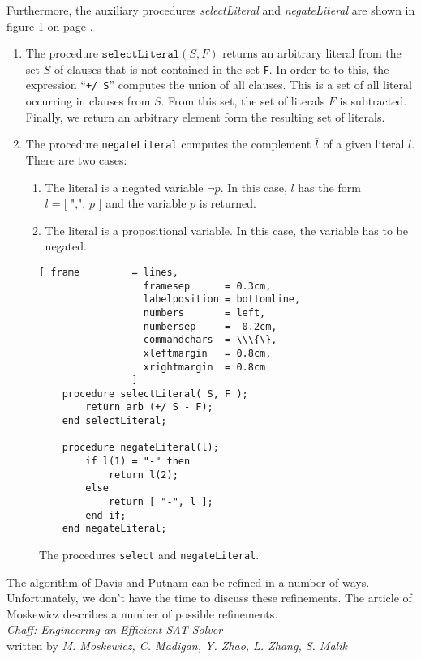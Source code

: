 \noindent
Furthermore, the auxiliary procedures \textsl{selectLiteral} and \textsl{negateLiteral}
are shown in figure  \ref{fig:solve-aux} on page \pageref{fig:solve-aux}.
\begin{enumerate}
\item The procedure $\texttt{selectLiteral}(S, F)$ returns an arbitrary literal from the
      set $S$ of clauses that is not contained in the set \texttt{F}.  In order to to
      this, the expression ``\texttt{+/ S}'' computes the union of all clauses.  This is a
      set of all literal occurring in clauses from $S$.  From this set, the set of
      literals $F$ is subtracted.  Finally, we return an arbitrary element form the
      resulting set of literals.
\item The procedure \texttt{negateLiteral} computes the complement $\overline{l}$ 
      of a given literal  $l$.  There are two cases:  
      \begin{enumerate}
      \item The literal is a negated variable $\neg p$.  In this case,
            $l$ has the form $l = \texttt{[ ",", $p$ ]}$ and the variable $p$ is returned.
      \item The literal is a propositional variable.  In this case, the variable has to be
            negated.
      \end{enumerate}
\end{enumerate}
\begin{figure}[!ht]
  \centering
\begin{Verbatim}[ frame         = lines, 
                  framesep      = 0.3cm, 
                  labelposition = bottomline,
                  numbers       = left,
                  numbersep     = -0.2cm,
                  commandchars  = \\\{\},
                  xleftmargin   = 0.8cm,
                  xrightmargin  = 0.8cm
                ]
    procedure selectLiteral( S, F );
        return arb (+/ S - F);
    end selectLiteral;

    procedure negateLiteral(l);
        if l(1) = "-" then
            return l(2);
        else
            return [ "-", l ];
        end if;
    end negateLiteral;
\end{Verbatim}
\vspace*{-0.3cm}
  \caption{The procedures \texttt{select} and \texttt{negateLiteral}.}
  \label{fig:solve-aux}
\end{figure}

The algorithm of Davis and Putnam can be refined in a number of ways.  Unfortunately, we
don't have the time to discuss these refinements.  The article of Moskewicz
\cite{moskewicz01} describes a number of possible refinements.   
\\[0.2cm]
\hspace*{1.3cm} \textsl{Chaff: Engineering an Efficient SAT Solver} \\
\hspace*{1.3cm} written by \emph{M. Moskewicz, C. Madigan, Y. Zhao, L. Zhang, S. Malik} \\
\pagebreak


